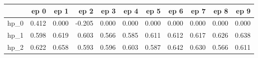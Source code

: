\begin{tabular}{lrrrrrrrrrr}
\toprule
{} &   ep 0 &   ep 1 &   ep 2 &   ep 3 &   ep 4 &   ep 5 &   ep 6 &   ep 7 &   ep 8 &   ep 9 \\
\midrule
hp\_0 &  0.412 &  0.000 & -0.205 &  0.000 &  0.000 &  0.000 &  0.000 &  0.000 &  0.000 &  0.000 \\
hp\_1 &  0.598 &  0.619 &  0.603 &  0.566 &  0.585 &  0.611 &  0.612 &  0.617 &  0.626 &  0.638 \\
hp\_2 &  0.622 &  0.658 &  0.593 &  0.596 &  0.603 &  0.587 &  0.642 &  0.630 &  0.566 &  0.611 \\
\bottomrule
\end{tabular}
